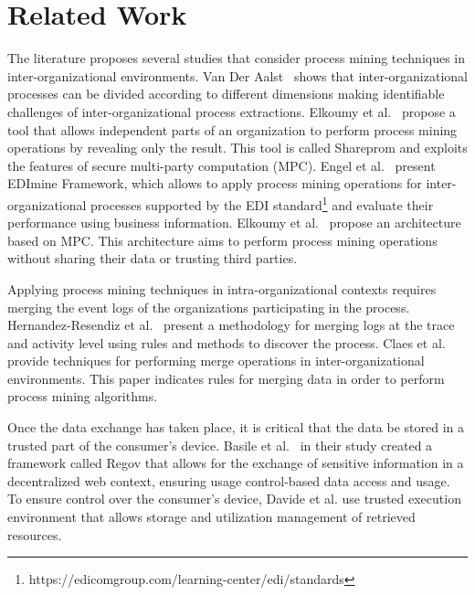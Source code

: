\section{Related Work}
\label{sec:background}

The literature proposes several studies that consider process mining techniques in inter-organizational environments.  Van Der Aalst~\cite{van2011intra} shows that inter-organizational processes can be divided according to different dimensions making identifiable challenges of inter-organizational process extractions. Elkoumy et al.~\cite{elkoumy2020shareprom} propose a tool that allows independent parts of an organization to perform process mining operations by revealing only the result. This tool is called Shareprom and exploits the features of secure multi-party computation (MPC). Engel et al.~\cite{engel2016analyzing}
present EDImine Framework, which allows to apply process mining operations for inter-organizational processes supported by the EDI standard\footnote{https://edicomgroup.com/learning-center/edi/standards} and evaluate their performance using business information.
Elkoumy et al.~\cite{elkoumy2020secure} propose an architecture based on MPC. This architecture aims to perform process mining operations without sharing their data or trusting third parties.


Applying process mining techniques in intra-organizational contexts requires merging the event logs of the organizations participating in the process. Hernandez-Resendiz et al.~\cite{hernandez2021merging} present a methodology for merging logs at the trace and activity level using rules and methods to discover the process. Claes et al.~\cite{claes2014merging} provide techniques for performing merge operations in inter-organizational environments. This paper indicates rules for merging data in order to perform process mining algorithms.

\cite{engel2011process}
\cite{engel2014case}
\cite{arfaoui2014trusted}
\cite{XIE2023321}

Once the data exchange has taken place, it is critical that the data be stored in a trusted part of the consumer's device. Basile et al.~\cite{Basile_Blockchain_based_resource_governance_for_decentralized_web_environments} in their study created a framework called Regov that allows for the exchange of sensitive information in a decentralized web context, ensuring usage control-based data access and usage. To ensure control over the consumer's device, Davide et al. use trusted execution environment that allows storage and utilization management of retrieved resources. 

